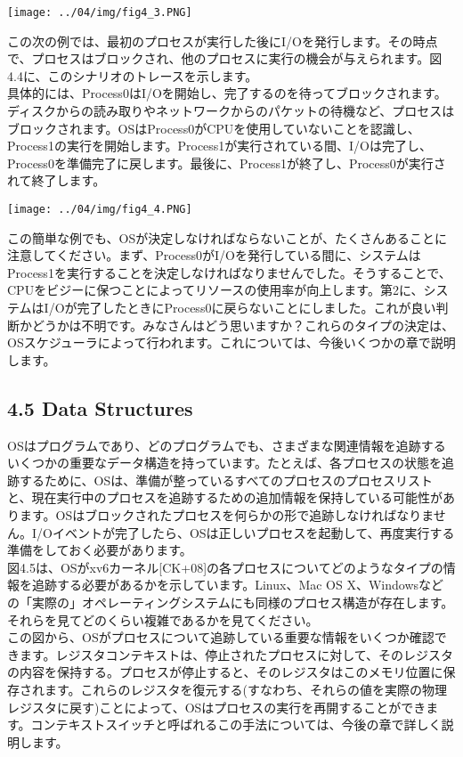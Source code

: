 \texttt{[image: ../04/img/fig4\_3.PNG]}

この次の例では、最初のプロセスが実行した後にI/Oを発行します。その時点で、プロセスはブロックされ、他のプロセスに実行の機会が与えられます。図4.4に、このシナリオのトレースを示します。\\
具体的には、Process0はI/Oを開始し、完了するのを待ってブロックされます。ディスクからの読み取りやネットワークからのパケットの待機など、プロセスはブロックされます。OSはProcess0がCPUを使用していないことを認識し、Process1の実行を開始します。Process1が実行されている間、I/Oは完了し、Process0を準備完了に戻します。最後に、Process1が終了し、Process0が実行されて終了します。

\texttt{[image: ../04/img/fig4\_4.PNG]}

この簡単な例でも、OSが決定しなければならないことが、たくさんあることに注意してください。まず、Process0がI/Oを発行している間に、システムはProcess1を実行することを決定しなければなりませんでした。そうすることで、CPUをビジーに保つことによってリソースの使用率が向上します。第2に、システムはI/Oが完了したときにProcess0に戻らないことにしました。これが良い判断かどうかは不明です。みなさんはどう思いますか？これらのタイプの決定は、OSスケジューラによって行われます。これについては、今後いくつかの章で説明します。

\hypertarget{data-structures}{%
\subsection*{4.5 Data Structures}\label{data-structures}}

OSはプログラムであり、どのプログラムでも、さまざまな関連情報を追跡するいくつかの重要なデータ構造を持っています。たとえば、各プロセスの状態を追跡するために、OSは、準備が整っているすべてのプロセスのプロセスリストと、現在実行中のプロセスを追跡するための追加情報を保持している可能性があります。OSはブロックされたプロセスを何らかの形で追跡しなければなりません。I/Oイベントが完了したら、OSは正しいプロセスを起動して、再度実行する準備をしておく必要があります。\\
図4.5は、OSがxv6カーネル{[}CK+08{]}の各プロセスについてどのようなタイプの情報を追跡する必要があるかを示しています。Linux、Mac
OS
X、Windowsなどの「実際の」オペレーティングシステムにも同様のプロセス構造が存在します。それらを見てどのくらい複雑であるかを見てください。\\
この図から、OSがプロセスについて追跡している重要な情報をいくつか確認できます。レジスタコンテキストは、停止されたプロセスに対して、そのレジスタの内容を保持する。プロセスが停止すると、そのレジスタはこのメモリ位置に保存されます。これらのレジスタを復元する(すなわち、それらの値を実際の物理レジスタに戻す)ことによって、OSはプロセスの実行を再開することができます。コンテキストスイッチと呼ばれるこの手法については、今後の章で詳しく説明します。


